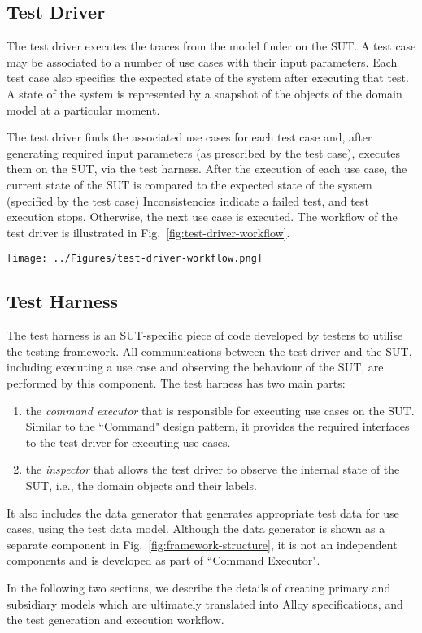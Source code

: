 \subsection{Test Driver}
\label{sec:framework-overview-test-driver}
The test driver executes the traces from the model finder on the SUT. A test case may be associated to  a number of use cases with their input parameters. Each test case also specifies the expected state of the system after executing that test. A state of the system is represented by a snapshot of the objects of the domain model at a particular moment. 

The test driver finds the associated use cases for each test case and, after generating required input parameters (as prescribed by the test case), executes them on the SUT, via the test harness. After the execution of each use case, the current state of the SUT is compared to the expected state of the system (specified by the test case) Inconsistencies indicate a failed test, and test execution stops. Otherwise, the next use case is executed.  The workflow of the test driver is illustrated in Fig.~\ref{fig:test-driver-workflow}.

\begin{figure*}[!t]
\centering
\texttt{[image: ../Figures/test-driver-workflow.png]}
\caption{The workflow of the test driver.}
\label{fig:test-driver-workflow}
\end{figure*}

\subsection{Test Harness}
\label{sec:framework-overview-test-harness}
The test harness is an SUT-specific piece of code developed by testers to utilise the testing framework. All communications between the test driver and the SUT, including executing a use case and observing the behaviour of the SUT, are performed by this component. The test harness has two main parts: 
\begin{enumerate}
	\item the \textit{command executor} that is responsible for executing use cases on the SUT. Similar to the ``Command" design pattern, it provides the required interfaces to the test driver for executing use cases. 
	
	\item the \textit{inspector} that allows the test driver to observe the internal state of the SUT, i.e., the domain objects and their labels.
\end{enumerate}

It also includes the data generator that generates appropriate test data for use cases, using the test data model. Although the data generator is shown as a separate component in Fig.~\ref{fig:framework-structure}, it is not an independent components and is developed as part of ``Command Executor". 

In the following two sections, we describe the details of creating primary and subsidiary models which are ultimately translated into Alloy specifications, and the test generation and execution workflow.